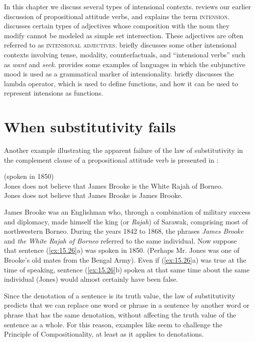 In this chapter we discuss several types of intensional contexts.  reviews our earlier discussion of propositional attitude verbs, and explains the term \textsc{intension}.  discusses certain types of adjectives whose composition with the noun they modify cannot be modeled as simple set intersection. These adjectives are often referred to as \textsc{intensional adjectives}.  briefly discusses some other intensional contexts involving tense, modality, counterfactuals, and “intensional verbs” such as \textit{want} and \textit{seek}.  provides some examples of languages in which the subjunctive mood is used as a grammatical marker of intensionality.  briefly discusses the lambda operator, which is used to define functions, and how it can be used to represent intensions as functions.


\section{When substitutivity fails}\label{sec:15.2}

Another example illustrating the apparent failure of the law of substitutivity in the complement clause of a propositional attitude verb is presented in :


\ea \label{ex:15.26}
(spoken in 1850)\\
\ea  Jones does not believe that James Brooke is the White Rajah of Borneo.\\
\ex Jones does not believe that James Brooke is James Brooke.
                       \z
\z


James Brooke was an Englishman who, through a combination of military success and diplomacy, made himself the king (or \textit{Rajah}) of Sarawak, comprising most of northwestern Borneo. During the years 1842 to 1868, the phrases \textit{James Brooke} and \textit{the White Rajah of Borneo} referred to the same individual. Now suppose that sentence (\ref{ex:15.26}a) was spoken in 1850. (Perhaps Mr. Jones was one of Brooke’s old mates from the Bengal Army). Even if (\ref{ex:15.26}a) was true at the time of speaking, sentence (\ref{ex:15.26}b) spoken at that same time about the same individual (Jones) would almost certainly have been false.


Since the denotation of a sentence is its truth value, the law of substitutivity predicts that we can replace one word or phrase in a sentence by another word or phrase that has the same denotation, without affecting the truth value of the sentence as a whole. For this reason, examples like  seem to challenge the Principle of Compositionality, at least as it applies to denotations.


